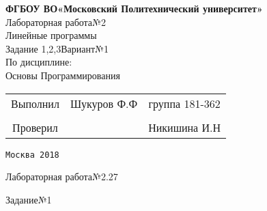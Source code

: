 \documentclass[a4paper]{article}
\begin{document}
\begin{center}
\hfill \break
\large{\textbf{ФГБОУ ВО«Московский Политехнический университет»}}\\
\hfill \break
\hfill \break
\hfill \break
\hfill \break
\hfill \break
\hfill \break
\hfill \break
\large{Лабораторная работа№2}\\
\footnotesize{Линейные программы\\
Задание 1,2,3\hspace{3cm}Вариант№1\break\\
По дисциплине:\\
Основы Программирования
}
\end{center}
\hfill \break
\hfill \break
\hfill \break
\hfill \break
\hfill \break
\hfill \break
\hfill \break
\hfill \break
\hfill \break
\hfill \break
\normalsize{ 
\begin{tabular}{ccc}
\hspace{4cm}Выполнил & Шукуров Ф.Ф  & группа 181-362\\
\\
\hspace{4cm}Проверил & \underline{\hspace{3cm}}& Никишина И.Н
\end{tabular}
}
\hfill \break
\hfill \break
\hfill \break
\hfill \break
\hfill \break
\hfill \break
\hfill \break
\hfill \break
\hfill \break
\hfill \break
\hfill \break
\hfill \break
\begin{center}\texttt{Москва 2018}\end{center}
\thispagestyle{empty}
\newpage
Лабораторная работа№2.27
\\
\begin{center}Задание№1\end{center}
\end{document}
